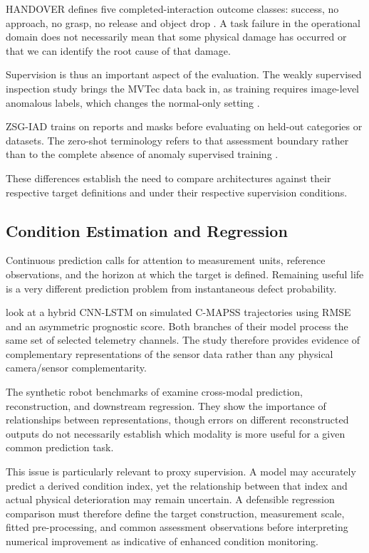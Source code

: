 HANDOVER defines five completed-interaction outcome classes: success, no approach, no grasp, no
release and object drop \parencite{Thoduka2024Handover}. A task failure in the operational domain
does not necessarily mean that some physical damage has occurred or that we can identify the root
cause of that damage.

Supervision is thus an important aspect of the evaluation. The weakly supervised inspection study
brings the MVTec data back in, as training requires image-level anomalous labels, which
changes the normal-only setting \parencite[p.~6659]{P035}.

ZSG-IAD trains on reports and masks before evaluating on held-out categories or datasets. The
zero-shot terminology refers to that assessment boundary rather than to the complete absence of
anomaly supervised training \parencite[pp.~6, 8--9]{P025}.

These differences establish the need to compare architectures against their respective target
definitions and under their respective supervision conditions.

\subsection{Condition Estimation and Regression}

Continuous prediction calls for attention to measurement units, reference observations, and the
horizon at which the target is defined. Remaining useful life is a very different prediction problem
from instantaneous defect probability.

\textcite{AlDulaimi2019A} look at a hybrid CNN-LSTM on simulated C-MAPSS trajectories using RMSE and an
asymmetric prognostic score. Both branches of their model process the same
set of selected telemetry channels. The study therefore provides evidence of complementary
representations of the sensor data rather than any physical camera/sensor complementarity.

The synthetic robot benchmarks of \textcite{Altinses2025Performance} examine cross-modal prediction,
reconstruction, and downstream regression. They show the importance
of relationships between representations, though errors on different reconstructed outputs do not
necessarily establish which modality is more useful for a given common prediction task.

This issue is particularly relevant to proxy supervision. A model may accurately predict a derived
condition index, yet the relationship between that index and actual physical deterioration may
remain uncertain. A defensible regression comparison must therefore define the target construction,
measurement scale, fitted pre-processing, and common assessment observations before interpreting
numerical improvement as indicative of enhanced condition monitoring.

